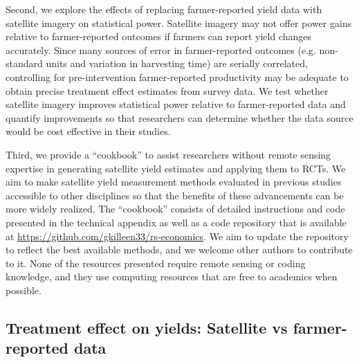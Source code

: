 \documentclass{article}
\begin{document}
Second, we explore the effects of replacing farmer-reported yield data with satellite imagery on statistical power. Satellite imagery may not offer power gains relative to farmer-reported outcomes if farmers can report yield changes accurately. Since many sources of error in farmer-reported outcomes (e.g. non-standard units and variation in harvesting time) are serially correlated, controlling for pre-intervention farmer-reported productivity may be adequate to obtain precise treatment effect estimates from survey data. We test whether satellite imagery improves statistical power relative to farmer-reported data and quantify improvements so that researchers can determine whether the data source would be cost effective in their studies. 

Third, we provide a ``cookbook'' to assist researchers without remote sensing expertise in generating satellite yield estimates and applying them to RCTs. We aim to make satellite yield measurement methods evaluated in previous studies accessible to other disciplines so that the benefits of these advancements can be more widely realized. The ``cookbook'' consists of detailed instructions and code presented in the technical appendix as well as a code repository that is available at \url{https://github.com/gkilleen33/rs-economics}. We aim to update the repository to reflect the best available methods, and we welcome other authors to contribute to it. None of the resources presented require remote sensing or coding knowledge, and they use computing resources that are free to academics when possible. 

\subsection{Treatment effect on yields: Satellite vs farmer-reported data} 
\end{document}
